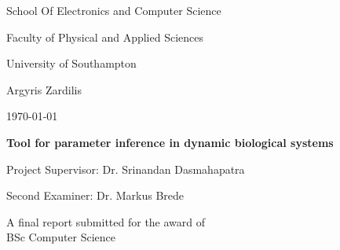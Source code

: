 \begin{titlepage}
    \let\footnotesize\small
    \let\footnoterule\relax
    \let \footnote \thanks
    \setcounter{footnote}{0}
    \begin{center}
      \setlength{\parskip}{0pt}
       {\large School Of Electronics and Computer Science \par}
      {\large Faculty of Physical and Applied Sciences \par}
      {\large University of Southampton \par}
      \vspace{29mm}
      {\large Argyris Zardilis \par}	
	\vspace{4mm}
      \large \today
	\vspace{13mm}
        \center
        {\Large \bf Tool for parameter inference in dynamic biological systems \par}
        \vspace{60mm}
      {\large Project Supervisor: Dr. Srinandan Dasmahapatra \par }
      {\large Second Examiner: Dr. Markus Brede \par}
      \vspace{12mm}
        {\large A final report submitted for the award of }\\
      {\large BSc Computer Science }
    \end{center}
    \vfil\null
  \end{titlepage}